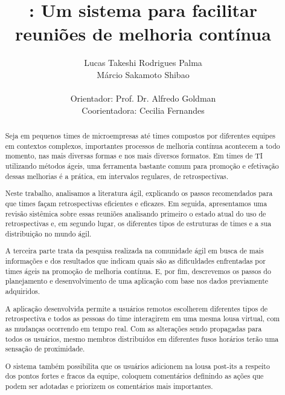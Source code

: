 \documentclass[titlepage, 12pt]{article}
\title{\suricato: Um sistema para facilitar reuniões de melhoria contínua}
\author{Lucas Takeshi Rodrigues Palma\\Márcio Sakamoto Shibao\\ \\Orientador: Prof. Dr. Alfredo Goldman\\Coorientadora: Cecilia Fernandes}
\begin{document}
	

\maketitle

\begin{abstract}
Seja em pequenos times de microempresas até times compostos por diferentes equipes em contextos complexos, importantes processos de melhoria contínua acontecem a todo momento, nas mais diversas formas e nos mais diversos formatos. Em times de TI utilizando métodos ágeis, uma ferramenta bastante comum para promoção e efetivação dessas melhorias é a prática, em intervalos regulares, de retrospectivas.

Neste trabalho, analisamos a literatura ágil, explicando os passos recomendados para que times façam retrospectivas eficientes e eficazes. Em seguida, apresentamos uma revisão sistêmica sobre essas reuniões analisando primeiro o estado atual do uso de retrospectivas e, em segundo lugar, os diferentes tipos de estruturas de times e a sua distribuição no mundo ágil.

A terceira parte trata da pesquisa realizada na comunidade ágil em busca de mais informações e dos resultados que indicam quais são as dificuldades enfrentadas por times ágeis na promoção de melhoria contínua. E, por fim, descrevemos os passos do planejamento e desenvolvimento de uma aplicação com base nos dados previamente adquiridos.

A aplicação desenvolvida permite a usuários remotos escolherem diferentes tipos de retrospectiva e todos as pessoas do time interagirem em uma mesma lousa virtual, com as mudanças ocorrendo em tempo real. Com as alterações sendo propagadas para todos os usuários, mesmo membros distribuídos em diferentes fusos horários terão uma sensação de
proximidade.

O sistema também possibilita que os usuários adicionem na lousa post-its a respeito dos pontos fortes e fracos da equipe, coloquem comentários definindo as ações que podem ser adotadas e priorizem os comentários mais importantes.
 
\end{abstract}
\newpage
\end{document}
